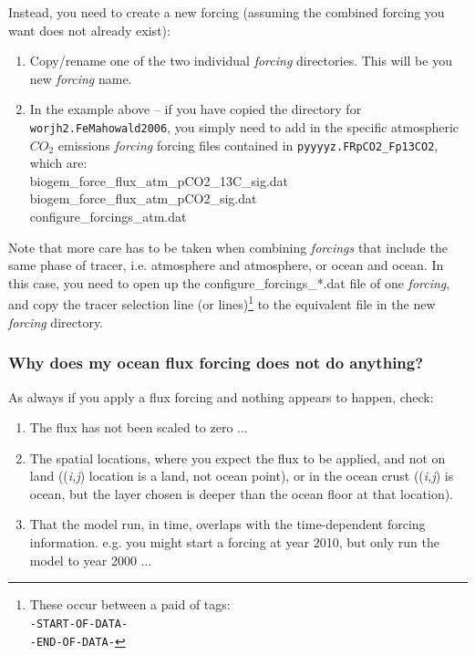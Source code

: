 \documentclass[11pt,fleqn]{book} %
\begin{document}
Instead, you need to create a new forcing (assuming the combined forcing you want does not already exist):
\begin{enumerate}[noitemsep]
\setlength{\itemindent}{.2in}
\item Copy/rename one of the two individual \textit{forcing} directories. This will be you new \textit{forcing} name.
\item In the example above -- if you have copied the directory for \texttt{worjh2.FeMahowald2006}, you simply need to add in the specific atmospheric \(CO_{2}\) emissions \textit{forcing} forcing files contained in \texttt{pyyyyz.FRpCO2\_Fp13CO2}, which are:
\\\footnotesize\textsf{
biogem\_force\_flux\_atm\_pCO2\_13C\_sig.dat\\
biogem\_force\_flux\_atm\_pCO2\_sig.dat\\
configure\_forcings\_atm.dat
}\normalsize
\end{enumerate}
Note that more care has to be taken when combining \textit{forcings} that include the same phase of tracer, i.e. atmosphere and atmosphere, or ocean and ocean. In this case, you need to open up the \textsf{\footnotesize configure\_forcings\_*.dat} file of one \textit{forcing}, and copy the tracer selection line (or lines)\footnote{These occur between a paid of tags:
\\\texttt{-START-OF-DATA-
\\-END-OF-DATA-}}
to the equivalent file in the new \textit{forcing} directory.

%
\subsubsection{Why does my ocean flux forcing does not do anything?}

As always if you apply a flux forcing and nothing appears to happen, check:

\begin{enumerate}[noitemsep]
\item The flux has not been scaled to zero ...
\item The spatial locations, where you expect the flux to be applied, and not on land ((\textit{i,j}) location is a land, not ocean point), or in the ocean crust ((\textit{i,j}) is ocean, but the layer chosen is deeper than the ocean floor at that location).
\item That the model run, in time, overlaps with the time-dependent forcing information. e.g. you might start a forcing at year 2010, but only run the model to year 2000 ...
\end{enumerate}
\end{document}
